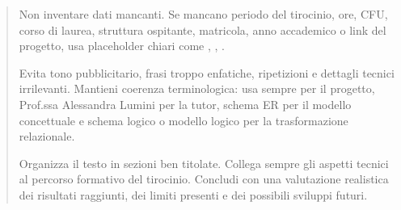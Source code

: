 \begin{quote}
Non inventare dati mancanti. Se mancano periodo del tirocinio, ore, CFU, corso di laurea, struttura ospitante, matricola, anno accademico o link del progetto, usa placeholder chiari come , , .

Evita tono pubblicitario, frasi troppo enfatiche, ripetizioni e dettagli tecnici irrilevanti. Mantieni coerenza terminologica: usa sempre \builder{} per il progetto, Prof.ssa Alessandra Lumini per la tutor, schema ER per il modello concettuale e schema logico o modello logico per la trasformazione relazionale.

Organizza il testo in sezioni ben titolate. Collega sempre gli aspetti tecnici al percorso formativo del tirocinio. Concludi con una valutazione realistica dei risultati raggiunti, dei limiti presenti e dei possibili sviluppi futuri.
\end{quote}
